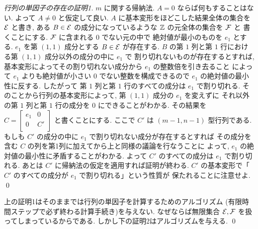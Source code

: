 \documentclass[12pt,twoside]{jarticle}
\begin{document}
\begin{proof}[行列の単因子の存在の証明1]
 $m$ に関する帰納法.  $A=0$ ならば何もすることはない. 
 よって $A\ne 0$ と仮定して良い.
 $A$ に基本変形をほどこした結果全体の集合を ${\mathcal E}$ と書き, 
 ある $B\in{\mathcal E}$ の成分になっているような ${\mathbb Z}$ の元全体の集合を ${\mathcal F}$ と
 書くことにする. ${\mathcal F}$ に含まれる $0$ でない元の中で
 絶対値が最小のものを $e_1$ とする.
 $e_1$ を第 $(1,1)$ 成分とする $B\in{\mathcal E}$ が存在する. 
 $B$ の第 $1$ 列と第 $1$ 行における第 $(1,1)$ 成分以外の成分の中に $e_1$ で
 割り切れないものが存在するとすれば, 
 基本変形によってその割り切れない成分から $e_1$ の整数倍を引き去ること
 によって $e_1$ よりも絶対値が小さい $0$ でない整数を構成できるので %
 $e_1$ の絶対値の最小性に反する.
 したがって 第 $1$ 列と第 $1$ 行のすべての成分は $e_1$ で割り切れる.
 そのことから行列の基本変形によって, 第 $(1,1)$ 成分の $e_1$ を変えずに
 それ以外の第 $1$ 列と第 $1$ 行の成分を $0$ にできることがわかる.
 その結果を \(
  C =
  \begin{bmatrix}
    e_1 & 0 \\
    0   & C' \\
  \end{bmatrix}
 \) と書くことにする. ここで $C'$ は $(m-1,n-1)$ 型行列である.
 もしも $C'$ の成分の中に $e_1$ で割り切れない成分が存在するとすれば 
 その成分を含む $C$ の列を第1列に加えてから上と同様の議論を行なうことに
 よって, $e_1$ の絶対値の最小性に矛盾することがわかる.
 よって $C'$ のすべての成分は $e_1$ で割り切れる.
 あとは $C'$ に帰納法の仮定を適用すれば証明が終わる.
 $C'$ の基本変形で「$C'$ のすべての成分が $e_1$ で割り切れる」という性質が
 保たれることに注意せよ.
 \qed
\end{proof}

\begin{rem}
 上の証明1はそのままでは行列の単因子を計算するためのアルゴリズム
 (有限時間ステップで必ず終わる計算手続き)を与えない. 
 なぜならば無限集合 ${\mathcal E},{\mathcal F}$ を扱ってしまっているからである.
 しかし下の証明2はアルゴリズムを与える.
 \qed
\end{rem}
\end{document}
